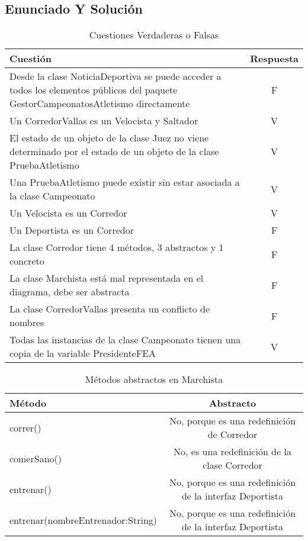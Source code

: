 \documentclass[a4paper,12pt]{article}
\begin{document}
\subsection{Enunciado Y Solución}

\begin{table}[H]
    \centering
    \begin{tabular}{|p{7cm}|c|}
    \hline
    \textbf{Cuestión} & \textbf{Respuesta} \\ \hline
    Desde la clase NoticiaDeportiva se puede acceder a todos los elementos públicos del paquete GestorCampeonatosAtletismo directamente & F \\ \hline
    Un CorredorVallas es un Velocista y Saltador & V \\ \hline
    El estado de un objeto de la clase Juez no viene determinado por el estado de un objeto de la clase PruebaAtletismo & V \\ \hline
    Una PruebaAtletismo puede existir sin estar asociada a la clase Campeonato & V \\ \hline
    Un Velocista es un Corredor & V \\ \hline
    Un Deportista es un Corredor & F \\ \hline
    La clase Corredor tiene 4 métodos, 3 abstractos y 1 concreto & F \\ \hline
    La clase Marchista está mal representada en el diagrama, debe ser abstracta & F \\ \hline
    La clase CorredorVallas presenta un conflicto de nombres & F \\ \hline
    Todas las instancias de la clase Campeonato tienen una copia de la variable PresidenteFEA & V \\ \hline
    \end{tabular}
    \caption{Cuestiones Verdaderas o Falsas}
\end{table}

\begin{table}[H]
    \centering
    \begin{tabular}{|l|c|}
    \hline
    \textbf{Método} & \textbf{Abstracto} \\ \hline
    correr() & No, porque es una redefinición de Corredor  \\ \hline
    comerSano() &   No, es una redefinición de la clase Corredor \\ \hline
    entrenar() &   No, porque es una redefinición de la interfaz Deportista \\ \hline
    entrenar(nombreEntrenador:String) &  No, porque es una redefinición de la interfaz Deportista \\ \hline
    \end{tabular}
    \caption{Métodos abstractos en Marchista}
\end{table}
\end{document}
